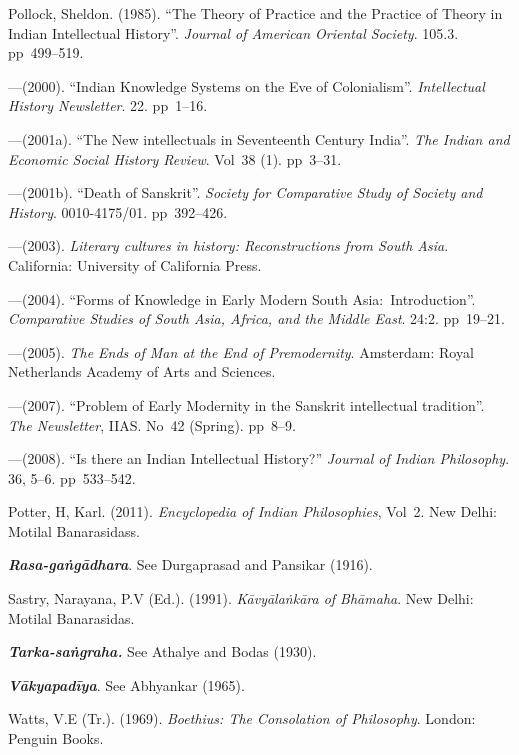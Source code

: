 \begin{thebibliography}{99}
 Pollock, Sheldon. (1985). “The Theory of Practice and the Practice of Theory in Indian Intellectual History”. {\sl Journal of American Oriental Society}. 105.3. pp~499--519. 

 ---\kern3pt(2000). “Indian Knowledge Systems on the Eve of Colonialism”. {\sl Intellectual History Newsletter}. 22. pp~1--16.

 ---\kern3pt(2001a). “The New intellectuals in Seventeenth Century India”. {\sl The Indian and Economic Social History Review}. Vol~38 (1). pp~3--31.

 ---\kern3pt(2001b). “Death of Sanskrit”. {\sl Society for Comparative Study of Society and History}. 0010-4175/01. pp~392--426. 

 ---\kern3pt(2003). {\sl Literary cultures in history: Reconstructions from South Asia}. California: University of California Press. 

 ---\kern3pt(2004). “Forms of Knowledge in Early Modern South Asia:~Introduction”. {\sl Comparative Studies of South Asia, Africa, and the Middle East}. 24:2. pp~19--21.

 ---\kern3pt(2005). {\sl The Ends of Man at the End of Premodernity}. Amsterdam: Royal Netherlands Academy of Arts and Sciences. 

 ---\kern3pt(2007). “Problem of Early Modernity in the Sanskrit intellectual tradition”. {\sl The Newsletter}, IIAS. No~42 (Spring). pp~8--9. 

 ---\kern3pt(2008). “Is there an Indian Intellectual History?” {\sl Journal of Indian Philosophy}. 36, 5--6. pp~533--542.

 Potter, H, Karl. (2011). {\sl  Encyclopedia of Indian Philosophies}, Vol~2. New Delhi: Motilal Banarasidass. 

{\sl\bfseries Rasa-gaṅgādhara}. See Durgaprasad and Pansikar (1916).

 Sastry, Narayana, P.V (Ed.). (1991). {\sl Kāvyālaṅkāra of Bhāmaha}. New Delhi: Motilal Banarasidas. 

 {\sl\bfseries Tarka-saṅgraha.} See Athalye and Bodas (1930).

{\sl\bfseries Vākyapadīya}. See Abhyankar (1965).

 Watts, V.E (Tr.). (1969). {\sl Boethius: The Consolation of Philosophy}. London: Penguin Books. 
\end{thebibliography}

\theendnotes
\label{chapter\thechapter:end}
